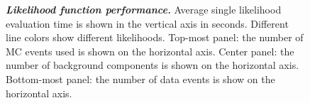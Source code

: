 \begin{figure}[ht]
\caption{\textbf{\textit{Likelihood function performance.}} Average single likelihood evaluation time is shown in the vertical axis in seconds.
Different line colors show different likelihoods.
Top-most panel: the number of MC events used is shown on the horizontal axis.
Center panel: the number of background components is shown on the horizontal axis.
Bottom-most panel: the number of data events is show on the horizontal axis.}
\label{fig:performance}
\end{figure}
